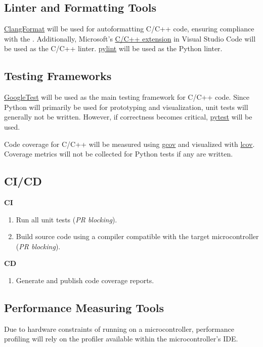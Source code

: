 \documentclass{article}
\begin{document}
\subsection{Linter and Formatting Tools}

\href{https://clang.llvm.org/docs/ClangFormat.html}{ClangFormat} will be used
for autoformatting C/C++ code, ensuring compliance with the
. Additionally, Microsoft’s
\href{https://code.visualstudio.com/docs/languages/cpp}{C/C++ extension} in
Visual Studio Code will be used as the C/C++ linter.
\href{https://pypi.org/project/pylint/}{pylint} will be used as the Python
linter.

\subsection{Testing Frameworks}
\href{https://github.com/google/googletest}{GoogleTest} will be used as the main
testing framework for C/C++ code. Since Python will primarily be used for
prototyping and visualization, unit tests will generally not be written.
However, if correctness becomes critical,
\href{https://docs.pytest.org/}{pytest} will be used.

Code coverage for C/C++ will be measured using
\href{https://gcc.gnu.org/onlinedocs/gcc/Gcov.html}{gcov} and visualized with
\href{https://wiki.documentfoundation.org/Development/Lcov}{lcov}. Coverage
metrics will not be collected for Python tests if any are written.

\subsection{CI/CD}

\textbf{CI}
\begin{enumerate}
  \item Run all unit tests (\textit{PR blocking}).
  \item Build source code using a compiler compatible with the target
  microcontroller (\textit{PR blocking}).
\end{enumerate}
\textbf{CD} %
\begin{enumerate}
    \item Generate and publish code coverage reports.
\end{enumerate}

\subsection{Performance Measuring Tools}
Due to hardware constraints of running on a microcontroller, performance
profiling will rely on the profiler available within the microcontroller’s IDE.
\end{document}
